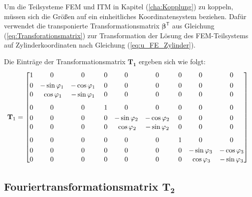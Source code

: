 Um die Teilsysteme FEM und ITM in Kapitel (\ref{cha:Kopplung}) zu koppeln, müssen sich die Größen auf ein einheitliches Koordinatensystem beziehen. 
Dafür verwendet \cite{Fruehe2010} die transponierte Transformationsmatrix $\boldsymbol{\beta}^{\mathsf T}$ aus Gleichung (\ref{eq:Transforationsmatrix}) zur Transformation der Lösung des FEM-Teilsystems auf Zylinderkoordinaten nach Gleichung (\ref{eq:u_FE_Zylinder}).

Die Einträge der Transformationsmatrix $\mathbf{T_1}$ ergeben sich wie folgt:
\begin{equation}\label{eq:Koordinatentransformationsmatrix}
	\begingroup
	\setlength{\arraycolsep}{5pt}\renewcommand{\arraystretch}{1.10}
	\mathbf T_{1}=
	\begin{bmatrix}
		1 & 0 & 0 \; & 0 & 0 & 0 \; & 0 & 0 & 0 \\[2pt]
		0 & -\sin\varphi_{1} & -\cos\varphi_{1} \; & 0 & 0 & 0 \; & 0 & 0 & 0 \\
		0 & \;\cos\varphi_{1} & -\sin\varphi_{1} \; & 0 & 0 & 0 \; & 0 & 0 & 0 \\[6pt]
		
		0 & 0 & 0 \; & 1 & 0 & 0 \; & 0 & 0 & 0 \\[2pt]
		0 & 0 & 0 \; & 0 & -\sin\varphi_{2} & -\cos\varphi_{2} \; & 0 & 0 & 0 \\
		0 & 0 & 0 \; & 0 & \;\cos\varphi_{2} & -\sin\varphi_{2} \; & 0 & 0 & 0 \\[6pt]
		
		0 & 0 & 0 \; & 0 & 0 & 0 \; & 1 & 0 & 0 \\[2pt]
		0 & 0 & 0 \; & 0 & 0 & 0 \; & 0 & -\sin\varphi_{3} & -\cos\varphi_{3} \\
		0 & 0 & 0 \; & 0 & 0 & 0 \; & 0 & \;\cos\varphi_{3} & -\sin\varphi_{3}
	\end{bmatrix}
	\endgroup
\end{equation}

\subsection{Fouriertransformationsmatrix $\mathbf{T_2}$}
\label{sec:Fouriertransformationsmatrix}

